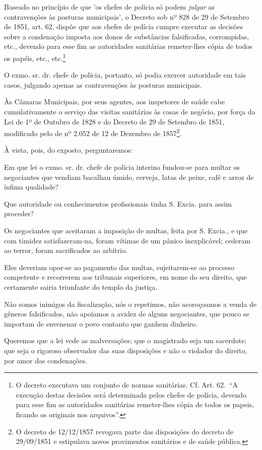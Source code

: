 Baseado no princípio de que 'os chefes de polícia só podem \emph{julgar}
as contravenções às posturas municipais', o Decreto sob nº 828 de 29 de
Setembro de 1851, art. 62, dispõe que aos chefes de polícia cumpre
executar as decisões sobre a condenação imposta aos donos de substâncias
falsificadas, corrompidas, etc., devendo para esse fim as autoridades
sanitárias remeter-lhes cópia de todos os papéis, etc., etc.\footnote{
  O decreto executava um conjunto de normas sanitárias. Cf. Art. 62.~``A
  execução destas decisões será determinada pelos chefes de polícia,
  devendo para esse fim as autoridades sanitárias remeter-lhes cópia de
  todos os papeis, ficando os originais nos arquivos''.}

O exmo. sr. dr. chefe de polícia, portanto, só podia exercer autoridade
em tais casos, julgando apenas as contravenções às posturas municipais.

Às Câmaras Municipais, por seus agentes, aos inspetores de saúde cabe
cumulativamente o serviço das visitas sanitárias às casas de negócio,
por força da Lei de 1º de Outubro de 1828 e do Decreto de 29 de Setembro
de 1851, modificado pelo de nº 2.052 de 12 de Dezembro de
1857\footnote{O decreto de 12/12/1857 revogava parte das disposições
  do decreto de 29/09/1851 e estipulava novos provimentos sanitários e
  de saúde pública.}.

À vista, pois, do exposto, perguntaremos:

Em que lei o exmo. sr. dr. chefe de polícia interino fundou-se para
multar os negociantes que vendiam bacalhau úmido, cerveja, latas de
peixe, café e arroz de ínfima qualidade?

Que autoridade ou conhecimentos profissionais tinha S. Excia. para assim
proceder?

Os negociantes que aceitaram a imposição de multas, feita por S. Excia.,
e que com timidez satisfazeram-na, foram vítimas de um pânico
inexplicável; cederam ao terror, foram sacrificados ao arbítrio.

Eles deveriam opor-se ao pagamento das multas, sujeitarem-se ao processo
competente e recorrerem aos tribunais superiores, em nome do seu
direito, que certamente sairia triunfante do templo da justiça.

Não somos inimigos da fiscalização, nós o repetimos, não acoroçoamos a
venda de gêneros falsificados, não apoiamos a avidez de alguns
negociantes, que pouco se importam de envenenar o povo contanto que
ganhem dinheiro.

Queremos que a lei vede as malversações; que o magistrado seja um
sacerdote; que seja o rigoroso observador das suas disposições e não o
violador do direito, por amor das condenações.

